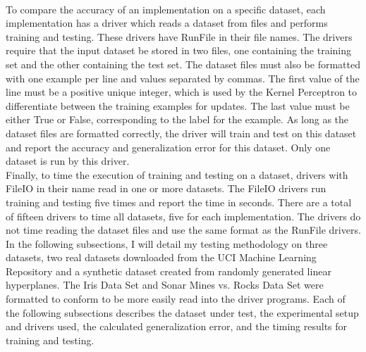 \\To compare the accuracy of an implementation on a specific dataset, each implementation has a driver which reads a dataset from files and performs training and testing. These drivers have RunFile in their file names. The drivers require that the input dataset be stored in two files, one containing the training set and the other containing the test set. The dataset files must also be formatted with one example per line and values separated by commas. The first value of the line must be a positive unique integer, which is used by the Kernel Perceptron to differentiate between the training examples for updates. The last value must be either True or False, corresponding to the label for the example. As long as the dataset files are formatted correctly, the driver will train and test on this dataset and report the accuracy and generalization error for this dataset. Only one dataset is run by this driver.
\\Finally, to time the execution of training and testing on a dataset, drivers with FileIO in their name read in one or more datasets. The FileIO drivers run training and testing five times and report the time in seconds. There are a total of fifteen drivers to time all datasets, five for each implementation. The drivers do not time reading the dataset files and use the same format as the RunFile drivers. 
\\In the following subsections, I will detail my testing methodology on three datasets, two real datasets downloaded from the UCI Machine Learning Repository \cite{DG17} and a synthetic dataset created from randomly generated linear hyperplanes. The Iris Data Set \cite{Fis36} and Sonar Mines vs. Rocks Data Set \cite{SG88} were formatted to conform to be more easily read into the driver programs. Each of the following subsections describes the dataset under test, the experimental setup and drivers used, the calculated generalization error, and the timing results for training and testing.

